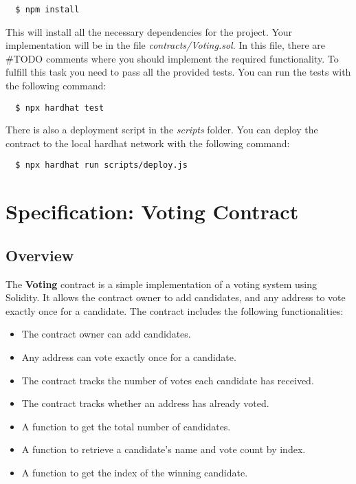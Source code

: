 \documentclass[12pt]{article}
\begin{document}
\begin{verbatim}
  $ npm install
\end{verbatim}
This will install all the necessary dependencies for the project. Your implementation will be in the file \textit{contracts/Voting.sol}. In this file, there are \#TODO comments where you should implement the required functionality. To fulfill this task you need to pass all the provided tests. You can run the tests with the following command:

\begin{verbatim}
  $ npx hardhat test
\end{verbatim}

There is also a deployment script in the \textit{scripts} folder. You can deploy the contract to the local hardhat network with the following command:
\begin{verbatim}
  $ npx hardhat run scripts/deploy.js
\end{verbatim}

\section{Specification: Voting Contract}

\subsection{Overview}

The \textbf{Voting} contract is a simple implementation of a voting system using Solidity. It allows the contract owner to add candidates, and any address to vote exactly once for a candidate. The contract includes the following functionalities:
\begin{itemize}
    \item The contract owner can add candidates.
    \item Any address can vote exactly once for a candidate.
    \item The contract tracks the number of votes each candidate has received.
    \item The contract tracks whether an address has already voted.
    \item A function to get the total number of candidates.
    \item A function to retrieve a candidate's name and vote count by index.
    \item A function to get the index of the winning candidate.
\end{itemize}
\end{document}
